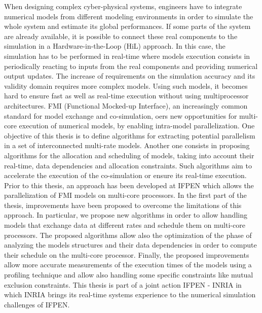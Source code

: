 When designing complex cyber-physical systems, engineers have to integrate numerical models
from different
modeling environments in order to simulate the whole system and estimate its global
performances. If some parts of the system are already available, it is possible to connect these
real components to the simulation in a Hardware-in-the-Loop (HiL) approach. In this case, the
simulation has to be performed in real-time where models execution consists in periodically
reacting to inputs from the real components and providing numerical output updates. The
increase of requirements on the simulation accuracy and its validity domain requires more
complex models. Using such models, it becomes hard to ensure fast as well as real-time execution without using
multiprocessor architectures. FMI (Functional Mocked-up Interface), an increasingly common
standard for model exchange and co-simulation, oers
new opportunities for multi-core execution
of numerical models, by enabling intra-model parallelization. One objective of this thesis is to
define algorithms for extracting potential parallelism in a set of interconnected multi-rate models.
Another one consists in proposing algorithms for the allocation and scheduling of models, taking
into account their real-time, data dependencies and allocation constraints. Such algorithms aim to accelerate the execution of the co-simulation or ensure its real-time execution. Prior to this thesis,
an approach has been developed at IFPEN which allows the parallelization of FMI models on
multi-core processors. In the first part of the thesis, improvements have been proposed to overcome
the limitations of this approach. In particular, we propose new algorithms in order to allow
handling models that exchange data at different
rates and schedule them on multi-core processors.
The proposed algorithms allow also the optimization of the phase of analyzing the models structures and
their data dependencies in order to compute their schedule on the multi-core processor. Finally, the
proposed improvements allow more accurate measurements of the execution times of the models using a profiling technique and allow also handling some specific constraints like mutual exclusion constraints. This thesis is part of a joint action IFPEN - INRIA in which INRIA brings its
real-time systems experience to the numerical simulation challenges of IFPEN.